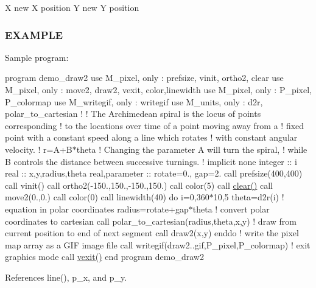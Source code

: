 X new X position Y new Y position

\subsubsection*{E\+X\+A\+M\+P\+LE}

Sample program\+:

program demo\+\_\+draw2 use M\+\_\+pixel, only \+: prefsize, vinit, ortho2, clear use M\+\_\+pixel, only \+: move2, draw2, vexit, color,linewidth use M\+\_\+pixel, only \+: P\+\_\+pixel, P\+\_\+colormap use M\+\_\+writegif, only \+: writegif use M\+\_\+units, only \+: d2r, polar\+\_\+to\+\_\+cartesian ! ! The Archimedean spiral is the locus of points corresponding ! to the locations over time of a point moving away from a ! fixed point with a constant speed along a line which rotates ! with constant angular velocity. ! r=A+\+B$\ast$theta ! Changing the parameter A will turn the spiral, ! while B controls the distance between successive turnings. ! implicit none integer \+:\+: i real \+:\+: x,y,radius,theta real,parameter \+:\+: rotate=0., gap=2. call prefsize(400,400) call vinit(\textquotesingle{}\textquotesingle{}) call ortho2(-\/150.,150.,-\/150.,150.) call color(5) call \hyperlink{namespacem__pixel_af3b81a21a0b2f6b5eddd09c031bd6173}{clear()} call move2(0.,0.) call color(0) call linewidth(40) do i=0,360$\ast$10,5 theta=d2r(i) ! equation in polar coordinates radius=rotate+gap$\ast$theta ! convert polar coordinates to cartesian call polar\+\_\+to\+\_\+cartesian(radius,theta,x,y) ! draw from current position to end of next segment call draw2(x,y) enddo ! write the pixel map array as a G\+IF image file call writegif(\textquotesingle{}draw2..\+gif\textquotesingle{},P\+\_\+pixel,P\+\_\+colormap) ! exit graphics mode call \hyperlink{namespacem__pixel_a19ad6b65752322b0029a62cc0ebec3e8}{vexit()} end program demo\+\_\+draw2 

References line(), p\+\_\+x, and p\+\_\+y.

\mbox{\label{namespacem__pixel_a42791c7e58158616dae7c36ec5806717}} 

